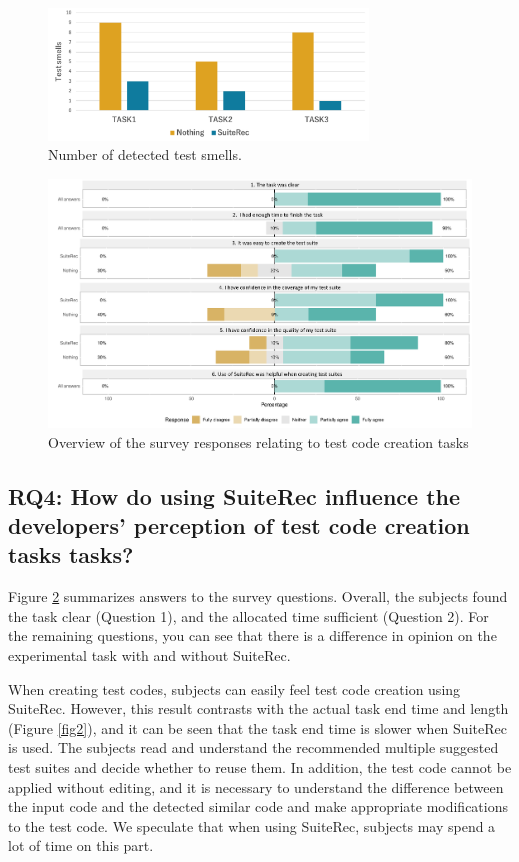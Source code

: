 \documentclass[conference]{IEEEtran}
\begin{document}
\begin{figure}[htbp]
\centerline{\includegraphics[width=8.5cm]{smells.pdf}}
\caption{Number of detected test smells.}
\label{fig8}
\end{figure}

\begin{figure}[t]
 \begin{center}
  \includegraphics[width=18.5cm]{suiterec-expt.pdf}
  \caption{Overview of the survey responses relating to test code creation tasks}
  \label{fig9}
 \end{center}
\end{figure}

\subsection{RQ4: How do using SuiteRec influence the developers’ perception of test code creation tasks tasks?}
Figure \ref{fig9} summarizes answers to the survey questions. Overall, the subjects found the task clear (Question 1), and the allocated time sufficient (Question 2). For the remaining questions, you can see that there is a difference in opinion on the experimental task with and without SuiteRec. 

When creating test codes, subjects can easily feel test code creation using SuiteRec. However, this result contrasts with the actual task end time and length (Figure \ref{fig2}), and it can be seen that the task end time is slower when SuiteRec is used. The subjects read and understand the recommended multiple suggested test suites and decide whether to reuse them. In addition, the test code cannot be applied without editing, and it is necessary to understand the difference between the input code and the detected similar code and make appropriate modifications to the test code. We speculate that when using SuiteRec, subjects may spend a lot of time on this part. 
\end{document}

